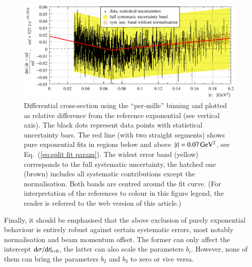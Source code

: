 \begin{figure}
\begin{center}
\includegraphics{fig/t_dist_rel_with_split_fit.pdf}
\vskip-4mm
\caption{%
Differential cross-section using the ``per-mille'' binning and plotted as relative difference from the reference exponential (see vertical axis). The black dots represent data points with statistical uncertainty bars. The red line (with two straight segments) shows pure exponential fits in regions below and above $|t| = 0.07\,{\rm GeV^2}$, see Eq.~(\ref{eq:split fit param}). The widest error band (yellow) corresponds to the full systematic uncertainty, the hatched one (brown) includes all systematic contributions except the normalisation. Both bands are centred around the fit curve. (For interpretation of the references to colour in this figure legend, the reader is referred to the web version of this article.)
}
\label{fig:data rel cpb0.001}
\end{center}
\end{figure}

Finally, it should be emphasised that the above exclusion of purely exponential behaviour is entirely robust against certain systematic errors, most notably normalisation and beam momentum offset. The former can only affect the intercept ${\rm d}\sigma/{\rm d} t|_{t=0}$, the latter can also scale the parameters $b_i$. However, none of them can bring the parameters $b_2$ and $b_3$ to zero or vice versa.
